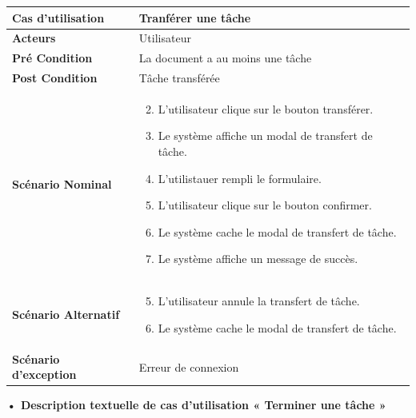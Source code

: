 \begin{longtable}{|p{5cm}|p{10cm}|}
\hline
\textbf{Cas d'utilisation}&Tranférer une tâche\\
\hline
\textbf{Acteurs}&Utilisateur\\
\hline
\textbf{Pré Condition}&La document a au moins une tâche\\
\hline
\textbf{Post Condition}&Tâche transférée\\
\hline
\textbf{Scénario Nominal}&
\vspace{-\baselineskip}
\begin{enumerate}
    \setcounter{enumi}{1}
    \item L'utilisateur clique sur le bouton transférer.
    \item Le système affiche un modal de transfert de tâche.
    \item L'utilistauer rempli le formulaire.
    \item L'utilisateur clique sur le bouton confirmer.
    \item Le système cache le modal de transfert de tâche.
    \item Le système affiche un message de succès.
\end{enumerate}\\
\hline
\textbf{Scénario Alternatif}&
\vspace{-\baselineskip}
\begin{enumerate}
    \setcounter{enumi}{4}
    \item L'utilisateur annule la transfert de tâche.
    \item Le système cache le modal de transfert de tâche.
\end{enumerate}\\
\hline
\textbf{Scénario d'exception}&Erreur de connexion\\
\hline
\end{longtable}

\textbf{•	Description textuelle de cas d'utilisation « Terminer une tâche »}

